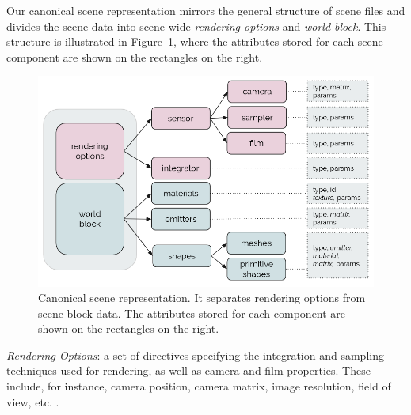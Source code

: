 

Our canonical scene representation mirrors the general structure of scene files and divides the scene data into
scene-wide {\it rendering options} and {\it world block}. 
This structure is illustrated in Figure~\ref{fig:canonicalrep}, where the attributes stored for each scene component are shown on the rectangles on the right.

\begin{figure}[h]
\centering
\includegraphics[width=0.9\linewidth]{figs/3_system_architecture/canonicalrep.png}
\caption{Canonical scene representation. It separates rendering options from scene block data. The attributes stored for each component are shown on the rectangles on the right.}
\label{fig:canonicalrep}
\end{figure}

\noindent \textit{Rendering Options}:
a set of directives specifying the integration and sampling techniques used for
rendering, as well as camera and film properties. These include, for instance, camera position, camera matrix, image resolution, field of view, etc.
.

